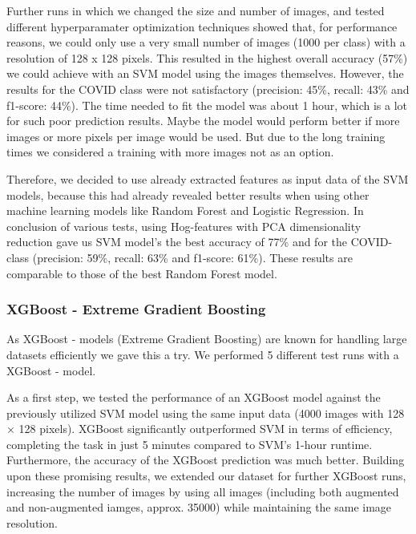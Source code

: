 \documentclass{article}
\begin{document}
Further runs in which we changed the size and number of images, and tested different hyperparamater optimization techniques showed that, for performance reasons, we could only use a very small number of images (1000 per class) with a resolution of 128 x 128 pixels. This resulted in the highest overall accuracy (57\%) we could achieve with an SVM model using the images themselves. However, the results for the COVID class were not satisfactory (precision: 45\%, recall: 43\% and f1-score: 44\%). The time needed to fit the model was about 1 hour, which is a lot for such poor prediction results. Maybe the model would perform better if more images or more pixels per image would be used. But due to the long training times we considered a training with more images not as an option.

Therefore, we decided to use already extracted features as input data of the SVM models, because this had already revealed better results when using other machine learning models like Random Forest and Logistic Regression. In conclusion of various tests, using Hog-features with PCA dimensionality reduction gave us SVM model's the best accuracy of 77\% and for the COVID-class (precision: 59\%, recall: 63\% and f1-score: 61\%). These results are comparable to those of the best Random Forest model.


\subsubsection{XGBoost - Extreme Gradient Boosting} \label{section:XGBoost}
As XGBoost - models (Extreme Gradient Boosting) are known for handling large datasets efficiently we gave this a try. We performed 5 different test runs with a XGBoost - model. 

As a first step, we tested the performance of an XGBoost model against the previously utilized SVM model using the same input data (4000 images with 128 × 128 pixels). XGBoost significantly outperformed SVM in terms of efficiency, completing the task in just 5 minutes compared to SVM’s 1-hour runtime. Furthermore, the accuracy of the XGBoost prediction was much better. 
Building upon these promising results, we extended our dataset for further XGBoost runs, increasing the number of images by using all images (including both augmented and non-augmented iamges, approx. 35000) while maintaining the same image resolution.
\end{document}
